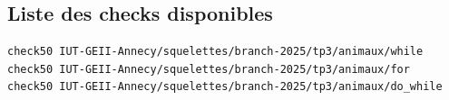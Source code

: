 \subsection*{Liste des checks disponibles}
\begin{lstlisting}[language=bash,style=console]
check50 IUT-GEII-Annecy/squelettes/branch-2025/tp3/animaux/while
check50 IUT-GEII-Annecy/squelettes/branch-2025/tp3/animaux/for
check50 IUT-GEII-Annecy/squelettes/branch-2025/tp3/animaux/do_while
\end{lstlisting}
